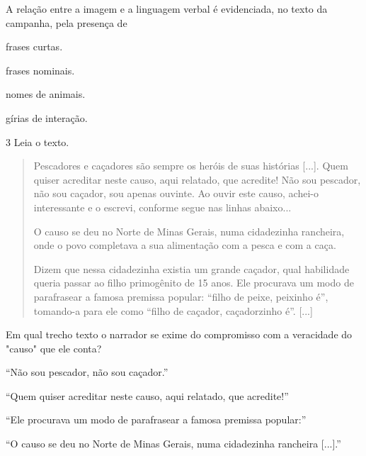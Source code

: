 A relação entre a imagem e a linguagem verbal é evidenciada, no texto da
campanha, pela presença de

\begin{escolha}
\item frases curtas.

\item frases nominais.

\item nomes de animais.

\item gírias de interação.
\end{escolha}

\num{3} Leia o texto.

\begin{quote}
Pescadores e caçadores são sempre os heróis de suas histórias {[}...{]}.
Quem quiser acreditar neste causo, aqui relatado, que acredite! Não sou
pescador, não sou caçador, sou apenas ouvinte. Ao ouvir este causo,
achei-o interessante e o escrevi, conforme segue nas linhas abaixo...

O causo se deu no Norte de Minas Gerais, numa cidadezinha rancheira,
onde o povo completava a sua alimentação com a pesca e com a caça.

Dizem que nessa cidadezinha existia um grande caçador, qual habilidade
queria passar ao filho primogênito de 15 anos. Ele procurava um modo de
parafrasear a famosa premissa popular: ``filho de peixe, peixinho é'',
tomando-a para ele como ``filho de caçador, caçadorzinho é''. {[}...{]}
\end{quote}


Em qual trecho texto o narrador se exime do compromisso com a veracidade
do "causo" que ele conta?

\begin{escolha}
\item ``Não sou pescador, não sou caçador.''

\item ``Quem quiser acreditar neste causo, aqui relatado, que acredite!''

\item ``Ele procurava um modo de parafrasear a famosa premissa popular:''

\item ``O causo se deu no Norte de Minas Gerais, numa cidadezinha rancheira
{[}...{]}.''
\end{escolha}

